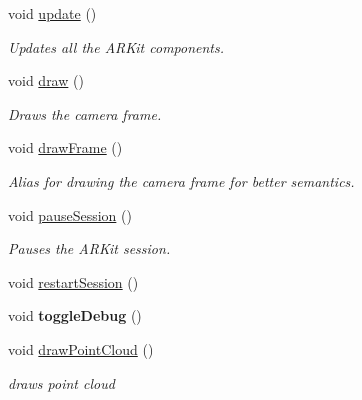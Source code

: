 \begin{DoxyCompactItemize}
\mbox{\label{class_a_r_processor_a76b6cbb62dcc0aa87e38e48cc8dbe621}} 
void \hyperlink{class_a_r_processor_a76b6cbb62dcc0aa87e38e48cc8dbe621}{update} ()
\begin{DoxyCompactList}\small\item\em Updates all the A\+R\+Kit components. \end{DoxyCompactList}\item 
\mbox{\label{class_a_r_processor_a20418bd305702c3346a109da9e1afcb0}} 
void \hyperlink{class_a_r_processor_a20418bd305702c3346a109da9e1afcb0}{draw} ()
\begin{DoxyCompactList}\small\item\em Draws the camera frame. \end{DoxyCompactList}\item 
\mbox{\label{class_a_r_processor_a685469fa6b66b8b5d935f6f45a2ef599}} 
void \hyperlink{class_a_r_processor_a685469fa6b66b8b5d935f6f45a2ef599}{draw\+Frame} ()
\begin{DoxyCompactList}\small\item\em Alias for drawing the camera frame for better semantics. \end{DoxyCompactList}\item 
\mbox{\label{class_a_r_processor_a035d352220785ee03e1bb15ba6bf688d}} 
void \hyperlink{class_a_r_processor_a035d352220785ee03e1bb15ba6bf688d}{pause\+Session} ()
\begin{DoxyCompactList}\small\item\em Pauses the A\+R\+Kit session. \end{DoxyCompactList}\item 
void \hyperlink{class_a_r_processor_a121cd3925743680196771ce07058d52e}{restart\+Session} ()
\item 
\mbox{\label{class_a_r_processor_a832585774cbeb04cc181f01c193940b5}} 
void {\bfseries toggle\+Debug} ()
\item 
\mbox{\label{class_a_r_processor_ae938bf188d56d8b30b141b2fa23e96f8}} 
void \hyperlink{class_a_r_processor_ae938bf188d56d8b30b141b2fa23e96f8}{draw\+Point\+Cloud} ()
\begin{DoxyCompactList}\small\item\em draws point cloud \end{DoxyCompactList}\item 

\end{DoxyCompactItemize}
